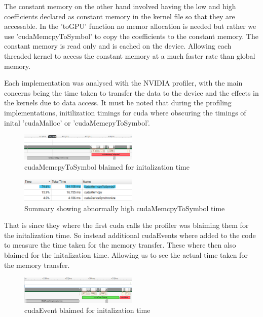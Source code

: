 \documentclass[journal,11pt]{IEEEtran}
\begin{document}
The constant memory on the other hand involved having the low and high coefficients declared as constant memory in the kernel file so that they are accessable. In the 'toGPU' function no memor allocation is needed but rather we use 'cudaMemcpyToSymbol' to copy the coefficients to the constant memory. The constant memory is read only and is cached on the device. Allowing each threaded kernel to access the constant memory at a much faster rate than global memory.

Each implementation was analysed with the NVIDIA profiler, with the main concerns being the time taken to transfer the data to the device and the effects in the kernels due to data access. It must be noted that during the profiling implementations, initilization timings for cuda where obscuring the timings of inital 'cudaMalloc' or 'cudaMemcpyToSymbol'. 

\begin{figure}[h]
    \centering
    \includegraphics[width=0.5\textwidth]{assets/blaimed-mem.png}
    \caption{cudaMemcpyToSymbol blaimed for initalization time}
    \label{fig:2}
\end{figure}

\begin{figure}[h]
    \centering
    \includegraphics[width=0.5\textwidth]{assets/blaimed-mem-sum.png}
    \caption{Summary showing abnormally high cudaMemcpyToSymbol time}
    \label{fig:3}
\end{figure}

That is since they where the first cuda calls the profiler was blaiming them for the initalization time. So instead additional cudaEvents where added to the code to measure the time taken for the memory transfer. These where then also blaimed for the initalization time. Allowing us to see the actual time taken for the memory transfer.


\begin{figure}[h]
    \centering
    \includegraphics[width=0.5\textwidth]{assets/blaimed-event.png}
    \caption{cudaEvent blaimed for initalization time}
    \label{fig:4}
\end{figure}
\end{document}
